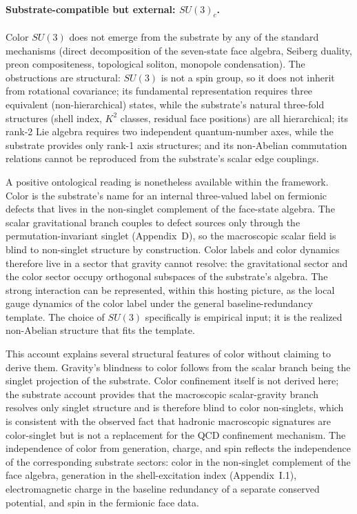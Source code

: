 \documentclass[11pt]{article}
\begin{document}
\paragraph{Substrate-compatible but external: $SU(3)_c$.}
Color $SU(3)$ does not emerge from the substrate by any of the standard mechanisms (direct decomposition of the seven-state face algebra, Seiberg duality, preon compositeness, topological soliton, monopole condensation). The obstructions are structural: $SU(3)$ is not a spin group, so it does not inherit from rotational covariance; its fundamental representation requires three equivalent (non-hierarchical) states, while the substrate's natural three-fold structures (shell index, $K^2$ classes, residual face positions) are all hierarchical; its rank-2 Lie algebra requires two independent quantum-number axes, while the substrate provides only rank-1 axis structures; and its non-Abelian commutation relations cannot be reproduced from the substrate's scalar edge couplings.

A positive ontological reading is nonetheless available within the framework. Color is the substrate's name for an internal three-valued label on fermionic defects that lives in the non-singlet complement of the face-state algebra. The scalar gravitational branch couples to defect sources only through the permutation-invariant singlet (Appendix~D), so the macroscopic scalar field is blind to non-singlet structure by construction. Color labels and color dynamics therefore live in a sector that gravity cannot resolve: the gravitational sector and the color sector occupy orthogonal subspaces of the substrate's algebra. The strong interaction can be represented, within this hosting picture, as the local gauge dynamics of the color label under the general baseline-redundancy template. The choice of $SU(3)$ specifically is empirical input; it is the realized non-Abelian structure that fits the template.

This account explains several structural features of color without claiming to derive them. Gravity's blindness to color follows from the scalar branch being the singlet projection of the substrate. Color confinement itself is not derived here; the substrate account provides that the macroscopic scalar-gravity branch resolves only singlet structure and is therefore blind to color non-singlets, which is consistent with the observed fact that hadronic macroscopic signatures are color-singlet but is not a replacement for the QCD confinement mechanism. The independence of color from generation, charge, and spin reflects the independence of the corresponding substrate sectors: color in the non-singlet complement of the face algebra, generation in the shell-excitation index (Appendix~I.1), electromagnetic charge in the baseline redundancy of a separate conserved potential, and spin in the fermionic face data.
\end{document}
